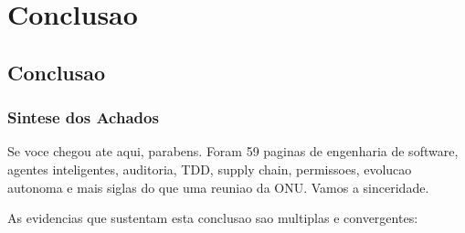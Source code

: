 \documentclass[12pt,a4paper,oneside,sumario=tradicional,chapter=TITLE,section=TITLE,subsection=TITLE,english,brazil]{abntex2}
\begin{document}
\cleardoublepage

\chapter{Conclusao}

\section{Conclusao}
\label{sec:conclusao}

\subsection{Sintese dos Achados}

Se voce chegou ate aqui, parabens. Foram 59 paginas de engenharia de software, agentes inteligentes, auditoria, TDD, supply chain, permissoes, evolucao autonoma e mais siglas do que uma reuniao da ONU. Vamos a sinceridade.

As evidencias que sustentam esta conclusao sao multiplas e convergentes:
\end{document}

